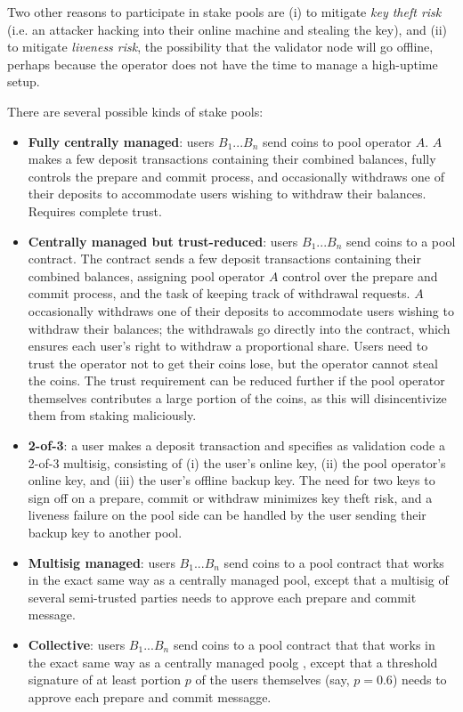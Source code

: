 \documentclass[12pt]{article}
\begin{document}
Two other reasons to participate in stake pools are (i) to mitigate \textit{key theft risk} (i.e. an attacker hacking into their online machine and stealing the key), and (ii) to mitigate \textit{liveness risk}, the possibility that the validator node will go offline, perhaps because the operator does not have the time to manage a high-uptime setup.

There are several possible kinds of stake pools:

\begin{itemize}
\item \textbf{Fully centrally managed}: users $B_1 ... B_n$ send coins to pool operator $A$. $A$ makes a few deposit transactions containing their combined balances, fully controls the prepare and commit process, and occasionally withdraws one of their deposits to accommodate users wishing to withdraw their balances. Requires complete trust.
\item \textbf{Centrally managed but trust-reduced}: users $B_1 ... B_n$ send coins to a pool contract. The contract sends a few deposit transactions containing their combined balances, assigning pool operator $A$ control over the prepare and commit process, and the task of keeping track of withdrawal requests. $A$ occasionally withdraws one of their deposits to accommodate users wishing to withdraw their balances; the withdrawals go directly into the contract, which ensures each user's right to withdraw a proportional share. Users need to trust the operator not to get their coins lose, but the operator cannot steal the coins. The trust requirement can be reduced further if the pool operator themselves contributes a large portion of the coins, as this will disincentivize them from staking maliciously.
\item \textbf{2-of-3}: a user makes a deposit transaction and specifies as validation code a 2-of-3 multisig, consisting of (i) the user's online key, (ii) the pool operator's online key, and (iii) the user's offline backup key. The need for two keys to sign off on a prepare, commit or withdraw minimizes key theft risk, and a liveness failure on the pool side can be handled by the user sending their backup key to another pool.
\item \textbf{Multisig managed}: users $B_1 ... B_n$ send coins to a pool contract that works in the exact same way as a centrally managed pool, except that a multisig of several semi-trusted parties needs to approve each prepare and commit message.
\item \textbf{Collective}: users $B_1 ... B_n$ send coins to a pool contract that that works in the exact same way as a centrally managed poolg
, except that a threshold signature of at least portion $p$ of the users themselves (say, $p = 0.6$) needs to approve each prepare and commit messagge.
\end{itemize}
\end{document}
